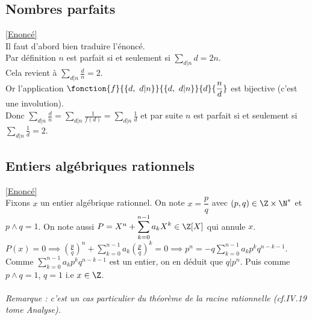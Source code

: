 \documentclass[8pt]{book}
\begin{document}
	\subsection{Nombres parfaits }
	\label{Nombres parfaits corrigé}
	\textcolor{blue}{\hyperref[Nombres parfaits]{[Enoncé]}}\\
	Il faut d'abord bien traduire l'énoncé.\\
	Par définition $n$ est parfait si et seulement si $\displaystyle\sum_{d|n}d=2n$.\\
	Cela revient à $\displaystyle\sum_{d|n}\frac{d}{n}=2$.\\
	Or l'application $\fonction{f}{\{d,\ d|n\}}{\{d,\ d|n\}}{d}{\dfrac{n}{d}}$ est bijective (c'est une involution).\\
	Donc $\displaystyle\sum_{d|n}\frac{d}{n}=\sum_{d|n}\frac{1}{f(d)}=\sum_{d|n}\frac{1}{d}$ et par suite $n$ est parfait si et seulement si $\displaystyle\sum_{d|n}\frac{1}{d}=2$.
	
	\subsection{Entiers algébriques rationnels }
	\label{Entiers algébriques rationnels corrigé}
	\textcolor{blue}{\hyperref[Entiers algébriques rationnels]{[Enoncé]}}\\
	Fixons $x$ un entier algébrique rationnel. On note $x=\dfrac{p}{q}$ avec $(p,q)\in \Z\times \N^*$ et $p\wedge q=1$. On note aussi $P=X^n+\displaystyle\sum_{k=0}^{n-1}a_kX^k\in \Z[X]$ qui annule $x$.\\
	$P(x)=0\implies \displaystyle\left(\frac{p}{q}\right)^n+\sum_{k=0}^{n-1}a_k\left(\frac{p}{q}\right)^k=0\implies p^n=-q\sum_{k=0}^{n-1}a_kp^kq^{n-k-1}$.\\
	Comme $\displaystyle\sum_{k=0}^{n-1}a_kp^kq^{n-k-1}$ est un entier, on en déduit que $q|p^n$. Puis comme $p\wedge q=1$, $q=1$ i.e $x\in \Z$.\\\\
	\textit{Remarque : c'est un cas particulier du théorème de la racine rationnelle (cf.IV.19 tome Analyse).}
	
\end{document}
